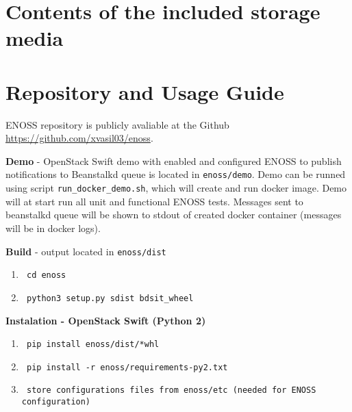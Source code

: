 
\chapter{Contents of the included storage media}

\chapter{Repository and Usage Guide}
ENOSS repository is publicly avaliable at the Github {\url{https://github.com/xvasil03/enoss}}.

\textbf{Demo} - OpenStack Swift demo with enabled and configured ENOSS to publish notifications to Beanstalkd queue is located in \texttt{enoss/demo}. Demo can be runned using script \texttt{run\_docker\_demo.sh}, which will create and run docker image. Demo will at start run all unit and functional ENOSS tests. Messages sent to beanstalkd queue will be shown to stdout of created docker container (messages will be in docker logs).

\textbf{Build} - output located in \texttt{enoss/dist}
\begin{enumerate}
    \item \begin{verbatim} cd enoss\end{verbatim}
    \item \begin{verbatim} python3 setup.py sdist bdsit_wheel\end{verbatim}
\end{enumerate}

\textbf{Instalation - OpenStack Swift (Python 2)}
\begin{enumerate}
    \item \begin{verbatim} pip install enoss/dist/*whl\end{verbatim}
    \item \begin{verbatim} pip install -r enoss/requirements-py2.txt\end{verbatim}
    \item \begin{verbatim} store configurations files from enoss/etc (needed for ENOSS configuration)\end{verbatim}
\end{enumerate}

